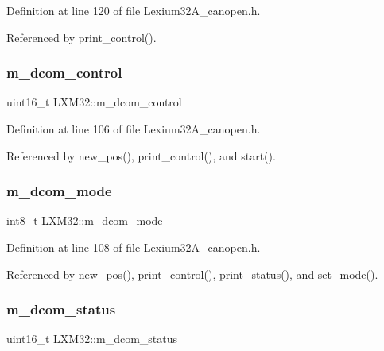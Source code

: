 Definition at line 120 of file Lexium32\+A\+\_\+canopen.\+h.



Referenced by print\+\_\+control().

\mbox{\label{class_l_x_m32_a574b8c11cd3333b00204f49d96ca91b3}} 
\subsubsection{\texorpdfstring{m\+\_\+dcom\+\_\+control}{m\_dcom\_control}}
{\footnotesize\ttfamily uint16\+\_\+t L\+X\+M32\+::m\+\_\+dcom\+\_\+control\hspace{0.3cm}{\ttfamily [private]}}



Definition at line 106 of file Lexium32\+A\+\_\+canopen.\+h.



Referenced by new\+\_\+pos(), print\+\_\+control(), and start().

\mbox{\label{class_l_x_m32_a5ce08e07c7b719bf655501ea7c32743c}} 
\subsubsection{\texorpdfstring{m\+\_\+dcom\+\_\+mode}{m\_dcom\_mode}}
{\footnotesize\ttfamily int8\+\_\+t L\+X\+M32\+::m\+\_\+dcom\+\_\+mode\hspace{0.3cm}{\ttfamily [private]}}



Definition at line 108 of file Lexium32\+A\+\_\+canopen.\+h.



Referenced by new\+\_\+pos(), print\+\_\+control(), print\+\_\+status(), and set\+\_\+mode().

\mbox{\label{class_l_x_m32_ac741ce060b7c1360ddde954f37b6465f}} 
\subsubsection{\texorpdfstring{m\+\_\+dcom\+\_\+status}{m\_dcom\_status}}
{\footnotesize\ttfamily uint16\+\_\+t L\+X\+M32\+::m\+\_\+dcom\+\_\+status\hspace{0.3cm}{\ttfamily [private]}}



